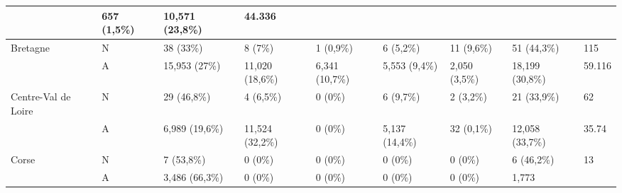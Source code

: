 \begin{table}[H]
{\begin{tabular}{|l|l|l|l|l|l|l|l|l|}
                                                              & 657 (1,5\%)     & 10,571 (23,8\%)                             & 44.336                                                                   \\ \hline
            Bretagne                                          & N               & 38 (33\%)                                   & 8 (7\%)         & 1 (0,9\%)        & 6 (5,2\%)      & 11 (9,6\%)
                                                              & 51 (44,3\%)     & 115                                                                                                                    \\
            ~                                                 & A               & 15,953 (27\%)                               & 11,020 (18,6\%) & 6,341 (10,7\%)   & 5,553 (9,4\%)
                                                              & 2,050 (3,5\%)   & 18,199 (30,8\%)                             & 59.116                                                                   \\ \hline
            Centre-Val de Loire                               & N               & 29 (46,8\%)                                 & 4 (6,5\%)       & 0 (0\%)          & 6 (9,7\%)
                                                              & 2 (3,2\%)       & 21 (33,9\%)                                 & 62                                                                       \\
            ~                                                 & A               & 6,989 (19,6\%)                              & 11,524 (32,2\%) & 0 (0\%)          & 5,137 (14,4\%) & 32
            (0,1\%)                                           & 12,058 (33,7\%) & 35.74                                                                                                                  \\ \hline
            Corse                                             & N               & 7 (53,8\%)                                  & 0 (0\%)         & 0 (0\%)          & 0 (0\%)        & 0 (0\%)    & 6
            (46,2\%)                                          & 13                                                                                                                                       \\
            ~                                                 & A               & 3,486 (66,3\%)                              & 0 (0\%)         & 0 (0\%)          & 0 (0\%)        & 0 (0\%)    & 1,773

\end{tabular}}
\end{table}
